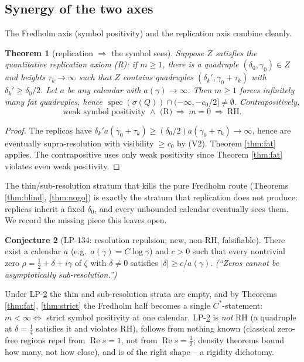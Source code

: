 \documentclass[11pt,reqno]{amsart}
\newtheorem{theorem}{Theorem}[section]
\theoremstyle{definition}
\newtheorem{conjecture}[theorem]{Conjecture}
\newcommand{\spec}{\operatorname{spec}}
\newcommand{\half}{\tfrac12}
\begin{document}
\subsection{Synergy of the two axes}
The Fredholm axis (symbol positivity) and the replication axis combine cleanly.

\begin{theorem}[replication \(\Rightarrow\) the symbol sees]\label{thm:synergy}
Suppose \(Z\) satisfies the quantitative replication axiom \emph{(R)}: if
\(m\geq1\), there is a quadruple \((\delta_0,\gamma_0)\in Z\) and heights
\(\tau_k\to\infty\) such that \(Z\) contains quadruples
\((\delta_k',\gamma_0+\tau_k)\) with \(\delta_k'\geq\delta_0/2\). Let \(a\) be any
calendar with \(a(\gamma)\to\infty\). Then \(m\geq1\) forces infinitely many fat
quadruples, hence
\(\spec(\sigma(Q))\cap(-\infty,-c_0/2]\neq\emptyset\). Contrapositively,
\[
\text{weak symbol positivity }\wedge\text{ (R)}\ \Longrightarrow\ m=0
\ \Longrightarrow\ \mathrm{RH}.
\]
\end{theorem}

\begin{proof}
The replicas have
\(\delta_k'a(\gamma_0+\tau_k)\geq(\delta_0/2)a(\gamma_0+\tau_k)\to\infty\), hence
are eventually supra-resolution with visibility \(\geq c_0\) by (V2). Theorem
\ref{thm:fat} applies. The contrapositive uses only weak positivity since
Theorem \ref{thm:fat} violates even weak positivity.
\end{proof}

The thin/sub-resolution stratum that kills the pure Fredholm route (Theorems
\ref{thm:blind}, \ref{thm:nogo}) is exactly the stratum that replication does
not produce: replicas inherit a fixed \(\delta_0\), and every unbounded
calendar eventually sees them. We record the missing piece this leaves open.

\begin{conjecture}[LP-134: resolution repulsion; new, non-RH, falsifiable]
\label{conj:lp134}
There exist a calendar \(a\) (e.g.\ \(a(\gamma)=C\log\gamma\)) and \(c>0\) such
that every nontrivial zero \(\rho=\half+\delta+i\gamma\) of \(\zeta\) with
\(\delta\neq0\) satisfies \(|\delta|\geq c/a(\gamma)\). \emph{(``Zeros cannot be
asymptotically sub-resolution.'')}
\end{conjecture}

Under LP-\ref{conj:lp134} the thin and sub-resolution strata are empty, and by
Theorems \ref{thm:fat}, \ref{thm:strict} the Fredholm half becomes a single
\(C^*\)-statement: \(m<\infty\iff\) strict symbol positivity at one calendar.
LP-\ref{conj:lp134} is \emph{not} RH (a quadruple at \(\delta=\tfrac14\)
satisfies it and violates RH), follows from nothing known (classical zero-free
regions repel from \(\operatorname{Re}s=1\), not from \(\operatorname{Re}s=\half\);
density theorems bound how many, not how close), and is of the right shape -- a
rigidity dichotomy.
\end{document}
